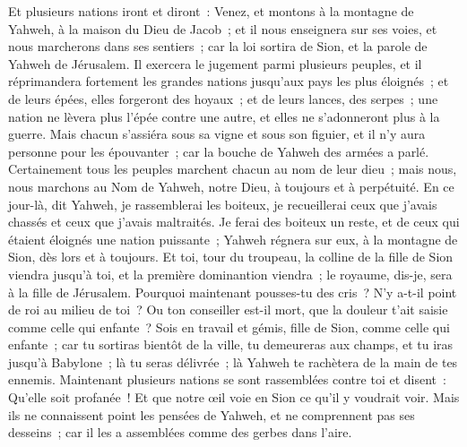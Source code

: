 \begin{multicols}{2}
Et plusieurs nations iront et diront~: Venez, et montons à la montagne de Yahweh, à la maison du Dieu de Jacob~; et il nous enseignera sur ses voies, et nous marcherons dans ses sentiers~; car la loi sortira de Sion, et la parole de Yahweh de Jérusalem.
Il exercera le jugement parmi plusieurs peuples, et il réprimandera fortement les grandes nations jusqu'aux pays les plus éloignés~; et de leurs épées, elles forgeront des hoyaux~; et de leurs lances, des serpes~; une nation ne lèvera plus l'épée contre une autre, et elles ne s'adonneront plus à la guerre.
Mais chacun s'assiéra sous sa vigne et sous son figuier, et il n'y aura personne pour les épouvanter~; car la bouche de Yahweh des armées a parlé.
Certainement tous les peuples marchent chacun au nom de leur dieu~; mais nous, nous marchons au Nom de Yahweh, notre Dieu, à toujours et à perpétuité.
En ce jour-là, dit Yahweh, je rassemblerai les boiteux, je recueillerai ceux que j'avais chassés et ceux que j'avais maltraités.
Je ferai des boiteux un reste, et de ceux qui étaient éloignés une nation puissante~; Yahweh régnera sur eux, à la montagne de Sion, dès lors et à toujours.
Et toi, tour du troupeau, la colline de la fille de Sion viendra jusqu'à toi, et la première dominantion viendra~; le royaume, dis-je, sera à la fille de Jérusalem.
Pourquoi maintenant pousses-tu des cris~? N'y a-t-il point de roi au milieu de toi~? Ou ton conseiller est-il mort, que la douleur t'ait saisie comme celle qui enfante~?
Sois en travail et gémis, fille de Sion, comme celle qui enfante~; car tu sortiras bientôt de la ville, tu demeureras aux champs, et tu iras jusqu'à Babylone~; là tu seras délivrée~; là Yahweh te rachètera de la main de tes ennemis.
Maintenant plusieurs nations se sont rassemblées contre toi et disent~: Qu'elle soit profanée~! Et que notre œil voie en Sion ce qu'il y voudrait voir.
Mais ils ne connaissent point les pensées de Yahweh, et ne comprennent pas ses desseins~; car il les a assemblées comme des gerbes dans l'aire.

\end{multicols}
